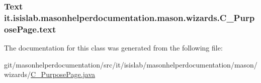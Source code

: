 \hypertarget{classit_1_1isislab_1_1masonhelperdocumentation_1_1mason_1_1wizards_1_1_c___purpose_page_abeec86a6fae75f2a485faeade141dd81}{
\subsubsection[{text}]{\setlength{\rightskip}{0pt plus 5cm}Text it.\-isislab.\-masonhelperdocumentation.\-mason.\-wizards.\-C\-\_\-\-Purpose\-Page.\-text\hspace{0.3cm}{\ttfamily [private]}}}\label{classit_1_1isislab_1_1masonhelperdocumentation_1_1mason_1_1wizards_1_1_c___purpose_page_abeec86a6fae75f2a485faeade141dd81}


The documentation for this class was generated from the following file\-:\begin{DoxyCompactItemize}
\item 
git/masonhelperdocumentation/src/it/isislab/masonhelperdocumentation/mason/wizards/\hyperlink{_c___purpose_page_8java}{C\-\_\-\-Purpose\-Page.\-java}\end{DoxyCompactItemize}
